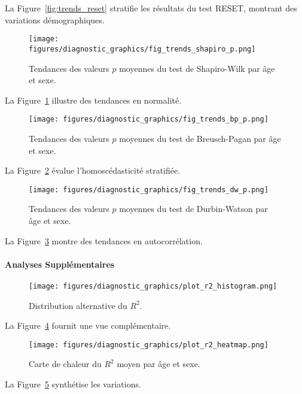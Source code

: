 La Figure~\ref{fig:trends_reset} stratifie les résultats du test RESET, montrant des variations démographiques.

\begin{figure}[H]
	\centering
	\texttt{[image: figures/diagnostic\_graphics/fig\_trends\_shapiro\_p.png]}
	\caption{Tendances des valeurs $p$ moyennes du test de Shapiro-Wilk par âge et sexe.}
	\label{fig:trends_shapiro}
\end{figure}

La Figure~\ref{fig:trends_shapiro} illustre des tendances en normalité.

\begin{figure}[H]
	\centering
	\texttt{[image: figures/diagnostic\_graphics/fig\_trends\_bp\_p.png]}
	\caption{Tendances des valeurs $p$ moyennes du test de Breusch-Pagan par âge et sexe.}
	\label{fig:trends_bp}
\end{figure}

La Figure~\ref{fig:trends_bp} évalue l'homoscédasticité stratifiée.

\begin{figure}[H]
	\centering
	\texttt{[image: figures/diagnostic\_graphics/fig\_trends\_dw\_p.png]}
	\caption{Tendances des valeurs $p$ moyennes du test de Durbin-Watson par âge et sexe.}
	\label{fig:trends_dw}
\end{figure}

La Figure~\ref{fig:trends_dw} montre des tendances en autocorrélation.

\paragraph{Analyses Supplémentaires}

\begin{figure}[H]
	\centering
	\texttt{[image: figures/diagnostic\_graphics/plot\_r2\_histogram.png]}
	\caption{Distribution alternative du $R^2$.}
	\label{fig:plot_r2}
\end{figure}

La Figure~\ref{fig:plot_r2} fournit une vue complémentaire.

\begin{figure}[H]
	\centering
	\texttt{[image: figures/diagnostic\_graphics/plot\_r2\_heatmap.png]}
	\caption{Carte de chaleur du $R^2$ moyen par âge et sexe.}
	\label{fig:heatmap_r2}
\end{figure}

La Figure~\ref{fig:heatmap_r2} synthétise les variations.

